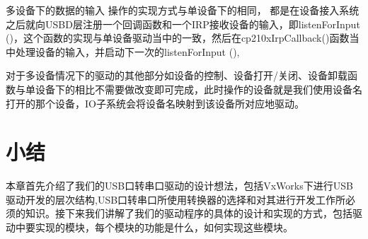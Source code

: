 	
	多设备下的数据的输入  操作的实现方式与单设备下的相同， 都是在设备接入系统之后就向USBD层注册一个回调函数和一个IRP接收设备的输入，即listenForInput ()，这个函数的实现与单设备驱动当中的一致，然后在cp210xIrpCallback()函数当中处理设备的输入，并启动下一次的listenForInput (),


	对于多设备情况下的驱动的其他部分如设备的控制、设备打开/关闭、设备卸载函数与单设备下的相比不需要做改变即可完成，此时操作的设备就是我们使用设备名打开的那个设备，IO子系统会将设备名映射到该设备所对应地驱动。





\section{小结}
	本章首先介绍了我们的USB口转串口驱动的设计想法，包括VxWorks下进行USB驱动开发的层次结构,USB口转串口所使用转换器的选择和对其进行开发工作所必须的知识。接下来我们讲解了我们的驱动程序的具体的设计和实现的方式，包括驱动中要实现的模块，每个模块的功能是什么，如何实现这些模块。



